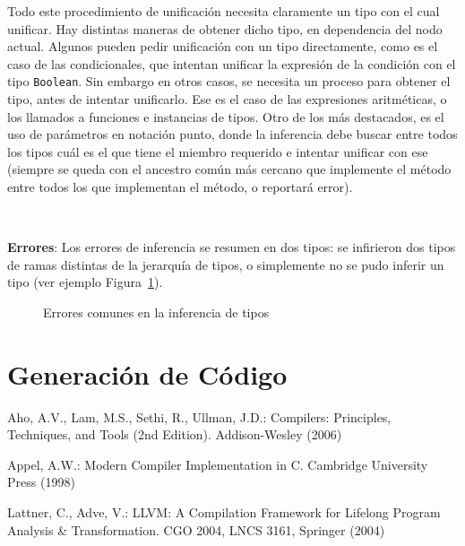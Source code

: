 \documentclass{llncs}
\begin{document}
Todo este procedimiento de unificación necesita claramente un tipo con el cual unificar. Hay distintas maneras de obtener dicho tipo, en dependencia del nodo actual. Algunos pueden pedir unificación con un tipo directamente, como es el caso de las condicionales, que intentan unificar la expresión de la condición con el tipo \texttt{Boolean}. 
Sin embargo en otros casos, se necesita un proceso para obtener el tipo, antes de intentar unificarlo. Ese es el caso de las expresiones aritméticas, o los llamados a funciones e instancias de tipos. Otro de los más destacados, es el uso de parámetros en notación punto, donde la inferencia debe buscar entre todos los tipos cuál es 
el que tiene el miembro requerido e intentar unificar con ese (siempre se queda con el ancestro común más cercano que implemente el método entre todos los que implementan el método, o reportará error).

\  

\textbf{Errores}: Los errores de inferencia se resumen en dos tipos: se infirieron dos tipos de ramas distintas de la jerarquía de tipos, o simplemente no se pudo inferir un tipo (ver ejemplo Figura~\ref{fig:errores_6}).
\begin{figure}[h]
\centering
\caption{Errores comunes en la inferencia de tipos}
\label{fig:errores_6}
\end{figure}

\vspace{10pt}
\section{Generación de Código}
\vspace{10pt}
\begin{thebibliography}{9}
Aho, A.V., Lam, M.S., Sethi, R., Ullman, J.D.: 
Compilers: Principles, Techniques, and Tools (2nd Edition). 
Addison-Wesley (2006)

Appel, A.W.: Modern Compiler Implementation in C. 
Cambridge University Press (1998)

Lattner, C., Adve, V.: 
LLVM: A Compilation Framework for Lifelong Program Analysis \& Transformation. 
CGO 2004, LNCS 3161, Springer (2004)
\end{thebibliography}
\end{document}

